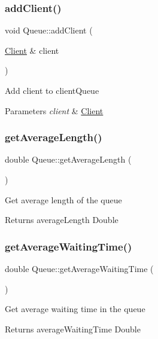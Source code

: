 \subsubsection{\texorpdfstring{add\+Client()}{addClient()}}
{\footnotesize\ttfamily void Queue\+::add\+Client (\begin{DoxyParamCaption}\item[{\hyperlink{classClient}{Client} \&}]{client }\end{DoxyParamCaption})}

Add client to client\+Queue 
\begin{DoxyParams}{Parameters}
{\em client} & \hyperlink{classClient}{Client} \\
\hline
\end{DoxyParams}
\mbox{\label{classQueue_afc73e60fa330498b5efdbf267d4508c2}} 
\subsubsection{\texorpdfstring{get\+Average\+Length()}{getAverageLength()}}
{\footnotesize\ttfamily double Queue\+::get\+Average\+Length (\begin{DoxyParamCaption}{ }\end{DoxyParamCaption})}

Get average length of the queue \begin{DoxyReturn}{Returns}
average\+Length Double 
\end{DoxyReturn}
\mbox{\label{classQueue_a21c1c1c4732177f6b8d8433ae5b4d771}} 
\subsubsection{\texorpdfstring{get\+Average\+Waiting\+Time()}{getAverageWaitingTime()}}
{\footnotesize\ttfamily double Queue\+::get\+Average\+Waiting\+Time (\begin{DoxyParamCaption}{ }\end{DoxyParamCaption})}

Get average waiting time in the queue \begin{DoxyReturn}{Returns}
average\+Waiting\+Time Double 
\end{DoxyReturn}
\mbox{\label{classQueue_ac52fd0970c24510a4d0d3086b027021a}} 
